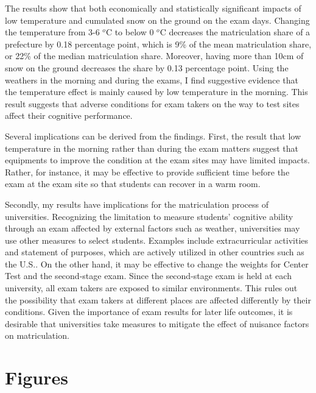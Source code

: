 \documentclass[12pt,letterpaper]{article}
\begin{document}
The results show that both economically and statistically significant impacts of low temperature and cumulated snow on the ground on the exam days.
Changing the temperature from 3-6 $^o$C to below 0 $^o$C decreases the matriculation share of a prefecture by 0.18 percentage point, which is 9\% of the mean matriculation share, or 22\% of the median matriculation share.
Moreover, having more than 10cm of snow on the ground decreases the share by 0.13 percentage point.
Using the weathers in the morning and during the exams, I find suggestive evidence that the temperature effect is mainly caused by low temperature in the morning.
This result suggests that adverse conditions for exam takers on the way to test sites affect their cognitive performance.

Several implications can be derived from the findings.
First, the result that low temperature in the morning rather than during the exam matters suggest that equipments to improve the condition at the exam sites may have limited impacts.
Rather, for instance, it may be effective to provide sufficient time before the exam at the exam site so that students can recover in a warm room.

Secondly, my results have implications for the matriculation process of universities.
Recognizing the limitation to measure students' cognitive ability through an exam affected by external factors such as weather, universities may use other measures to select students.
Examples include extracurricular activities and statement of purposes, which are actively utilized in other countries such as the U.S..
On the other hand, it may be effective to change the weights for Center Test and the second-stage exam.
Since the second-stage exam is held at each university, all exam takers are exposed to similar environments.
This rules out the possibility that exam takers at different places are affected differently by their conditions.
Given the importance of exam results for later life outcomes, it is desirable that universities take measures to mitigate the effect of nuisance factors on matriculation.

\clearpage



\section{Figures}
\end{document}

